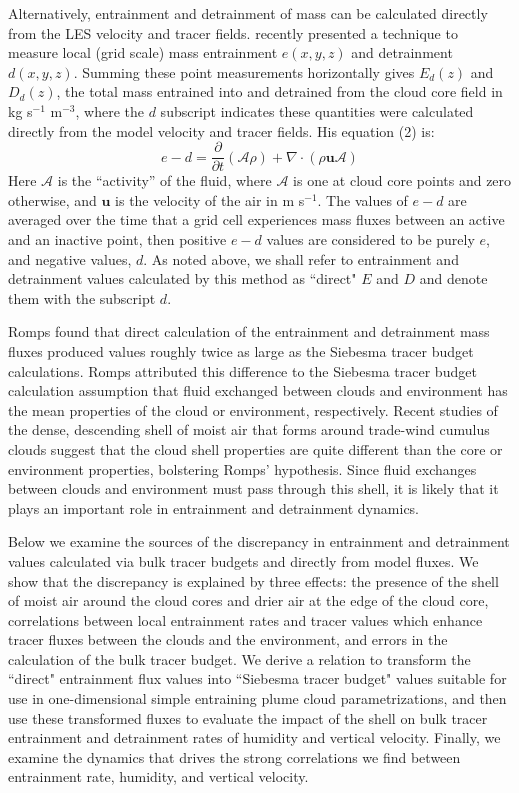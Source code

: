 \documentclass[12pt]{article}
\begin{document}
Alternatively, entrainment and detrainment of mass can be calculated directly
from the LES velocity and tracer fields.  \cite{Romps2010} recently presented a 
technique to measure local (grid scale) mass entrainment $e(x,y,z)$ and
detrainment $d(x,y,z)$.  Summing these point measurements horizontally gives 
$E_d(z)$ and $D_d(z)$, the total mass entrained into and detrained from the
cloud core field in kg s$^{-1}$ m$^{-3}$, where the $d$ subscript indicates 
these quantities were calculated directly from the model velocity and tracer
fields.  His equation (2) is:
\begin{equation}
  \label{eq:romps_e_minus_d}
  e - d = \frac{\partial}{\partial t}(\mathcal{A}\rho) 
        + \nabla \cdot (\rho \mathbf{u} \mathcal{A}) 
\end{equation}
Here $\mathcal{A}$ is the ``activity'' of the fluid, where
$\mathcal{A}$ is one at cloud core points and zero otherwise, and
$\mathbf{u}$ is the velocity of the air in m s$^{-1}$.  The values of
$e - d$ are averaged over the time that a grid cell experiences mass
fluxes between an active and an inactive point, then positive $e-d$
values are considered to be purely $e$, and negative values, $d$.  As
noted above, we shall refer to entrainment and detrainment values
calculated by this method as ``direct" $E$ and $D$ and denote them
with the subscript $d$.

Romps found that direct calculation of the entrainment and
detrainment mass fluxes produced values roughly twice as large as
the Siebesma tracer budget calculations.  Romps attributed this difference
to the Siebesma tracer budget calculation assumption that fluid
exchanged between clouds and environment has the mean properties of
the cloud or environment, respectively.  Recent studies of the dense,
descending shell of moist air that forms around trade-wind cumulus
clouds \citep{Heus2008, Wang2010} suggest that the cloud shell
properties are quite different than the core or environment
properties, bolstering Romps' hypothesis.  Since fluid exchanges
between clouds and environment must pass through this shell, it is
likely that it plays an important role in entrainment and detrainment
dynamics.

Below we examine the sources of the discrepancy in entrainment and
detrainment values calculated via bulk tracer budgets and directly
from model fluxes.  We show that the discrepancy is explained by three
effects: the presence of the shell of moist air around the cloud cores
and drier air at the edge of the cloud core, correlations between
local entrainment rates and tracer values which enhance tracer fluxes
between the clouds and the environment, and errors in the calculation
of the bulk tracer budget.  We derive a relation to transform the
``direct" entrainment flux values into ``Siebesma tracer budget"
values suitable for use in one-dimensional simple entraining plume
cloud parametrizations, and then use these transformed fluxes to
evaluate the impact of the shell on bulk tracer entrainment and
detrainment rates of humidity and vertical velocity.  Finally, we
examine the dynamics that drives the strong correlations we find
between entrainment rate, humidity, and vertical velocity.
\end{document}
